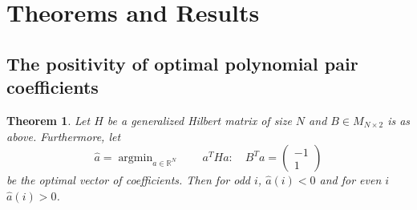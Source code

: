 \documentclass{article}
\newtheorem{thm}{Theorem}[section]
\theoremstyle{definition}
\theoremstyle{remark}
\numberwithin{equation}{section}
\DeclareMathOperator{\argmin}{argmin}
\begin{document}
\section{Theorems and Results}
\subsection{The positivity of optimal polynomial pair coefficients}

\begin{thm}\label{positivity-hilbert-coefficients}
Let $H$ be a generalized Hilbert matrix of size $N$ and $B \in M_{N\times 2}$ is as above. Furthermore, let 
\[ \hat{a} = \argmin_{a\in\mathbb{R}^N} \quad \quad a^THa : \quad B^Ta = \begin{pmatrix} -1 \\ 1 \end{pmatrix}\]
be the optimal vector of coefficients. Then for odd $i$, $\hat{a}(i) < 0$ and for even $i$ $\hat{a}(i) > 0$.
\end{thm} 
\end{document}
